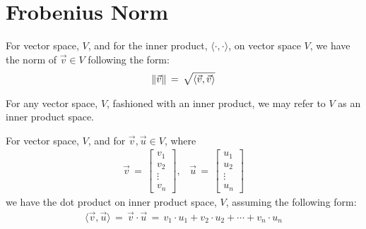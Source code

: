 \section{Frobenius Norm}

\begin{tcolorbox}[sharp corners, colback=red!5!white, colframe=black!75!black, fontupper=\color{black}]
\begin{definition}
    For vector space, $V$, and for the inner product, $\langle \cdot, \cdot \rangle$, on vector space $V$, we have the norm of $\vec{v} \in V$ following the form:
    \begin{align*}
        \left\lVert\vec{v}\right\rVert \hspace{2pt} = \hspace{2pt} \sqrt{\langle \vec{v}, \vec{v} \rangle}
    \end{align*}
\end{definition}
\end{tcolorbox}

For any vector space, $V$, fashioned with an inner product, we may refer to $V$ as an inner product space.

\begin{tcolorbox}[sharp corners, colback=red!5!white, colframe=black!75!black, fontupper=\color{black}]
\begin{definition}
    For vector space, $V$, and for $\vec{v}, \vec{u} \in V$, where 
    \begin{align*}
        \vec{v} \hspace{2pt} = \hspace{2pt} \begin{bmatrix}
            v_{1}\\ 
            v_{2}\\ 
            \vdots\\
            v_{n}
        \end{bmatrix}, \hspace{10pt}
        \vec{u} \hspace{2pt} = \hspace{2pt}
        \begin{bmatrix}
            u_{1}\\
            u_{2}\\
            \vdots\\
            u_{n}
        \end{bmatrix}
    \end{align*}
    we have the dot product on inner product space, $V$, assuming the following form:
    \begin{align*}
        \langle \vec{v}, \vec{u} \rangle \hspace{2pt} = \hspace{2pt} \vec{v} \cdot \vec{u} \hspace{2pt} = \hspace{2pt} v_{1} \cdot u_{1} + v_{2} \cdot u_{2} + \cdots + v_{n} \cdot u_{n}
    \end{align*}
\end{definition}
\end{tcolorbox}

